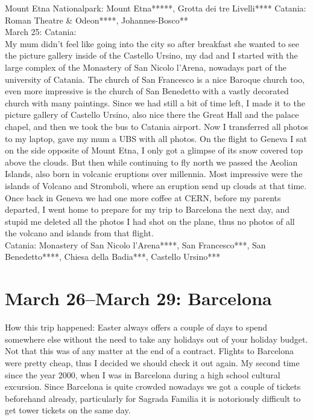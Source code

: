 Mount Etna Nationalpark: Mount Etna*****, Grotta dei tre Livelli****
Catania: Roman Theatre \& Odeon****, Johannes-Bosco**\\

March 25: Catania:\\
My mum didn't feel like going into the city so after breakfast she wanted to see the picture gallery inside of the Castello Ursino, my dad and I started with the large complex of the Monastery of San Nicolo l'Arena, nowadays part of the university of Catania. The church of San Francesco is a nice Baroque church too, even more impressive is the church of San Benedetto with a vastly decorated church with many paintings. Since we had still a bit of time left, I made it to the picture gallery of Castello Ursino, also nice there the Great Hall and the palace chapel, and then we took the bus to Catania airport. Now I transferred all photos to my laptop, gave my mum a UBS with all photos. On the flight to Geneva I sat on the side opposite of Mount Etna, I only got a glimpse of its snow covered top above the clouds. But then while continuing to fly north we passed the Aeolian Islands, also born in volcanic eruptions over millennia. Most impressive were the islands of Volcano and Stromboli, where an eruption send up clouds at that time. Once back in Geneva we had one more coffee at CERN, before my parents departed, I went home to prepare for my trip to Barcelona the next day, and stupid me deleted all the photos I had shot on the plane, thus no photos of all the volcano and islands from that flight.\\

Catania: Monastery of San Nicolo l'Arena****, San Francesco***, San Benedetto****, Chiesa della Badia***, Castello Ursino***

\section{March 26--March 29: Barcelona}
\label{Barcelona2016}

How this trip happened: Easter always offers a couple of days to spend somewhere else without the need to take any holidays out of your holiday budget. Not that this was of any matter at the end of a contract. Flights to Barcelona were pretty cheap, thus I decided we should check it out again. My second time since the year 2000, when I was in Barcelona during a high school cultural excursion. Since Barcelona is quite crowded nowadays we got a couple of tickets beforehand already, particularly for Sagrada Familia it is notoriously difficult to get tower tickets on the same day.\\

